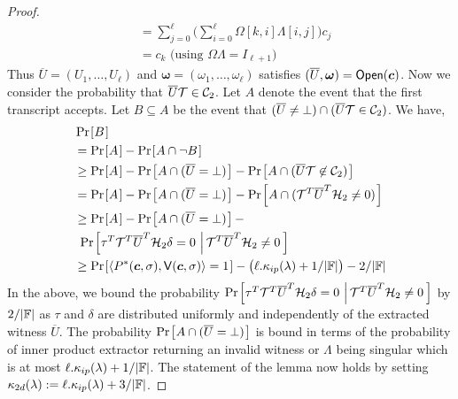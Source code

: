 \begin{proof}
\begin{align*}
	&= \sum_{j=0}^{\ell}\big(\sum_{i=0}^{\ell}\Omega[k,i]\Lambda[i,j]\big)c_j
\\
	&= c_k \text{ (using $\Omega\Lambda=I_{\ell+1})$ }
\end{align*}
Thus $\overline{U}=(U_1,\ldots,U_{\ell})$ and $\bm{\omega}=(\omega_1,\ldots,\omega_{\ell})$ satisfies $(\overline{U},\bm{\omega})=\mathsf{Open}(\bm{c})$. Now we
consider the probability that $\overline{U}\mathcal{T}\in \mathcal{C}_2$. Let $A$ denote the event
that the first transcript accepts. Let $B\subseteq A$ be the event that
$(\overline{U}\neq\bot)\cap (\overline{U}\mathcal{T}\in \mathcal{C}_2)$. We have,
\begin{align*}
&\prob{B}\\ &= \prob{A} - \prob{A\cap \neg B} \\
	&\geq \prob{A} - \prob{A\cap (\overline{U}=\bot)} - \prob{A\cap
(\overline{U}\mc{T}\not\in \mc{C}_2)} \\
	&= \prob{A} - \prob{A\cap (\overline{U}=\bot)} - \prob{A\cap
(\mc{T}^T\overline{U}^T\mc{H}_2\neq 0)} \\
	&\geq \prob{A} - \prob{A\cap (\overline{U}=\bot)} -\\
& \text{     }\condprob{\tau^T\mc{T}^T\overline{U}^T\mc{H}_2\delta=
0}{\mc{T}^T\overline{U}^T\mc{H}_2\neq 0} \\
	&\geq \prob{\langle P^\ast(\bm{c},\sigma),\verifier(\bm{c},\sigma)\rangle=1}
- \big(\ell.\kappa_{ip}(\secpar)+1/|\FF|\big) - 2/|\FF|
\end{align*} 
In the above, we bound the probability $\condprob{\tau^T\mc{T}^T\overline{U}^T\mc{H}_2\delta=
0}{\mc{T}^T\overline{U}^T\mc{H}_2\neq 0}$ by $2/|\mathbb{F}|$ as $\tau$ and $\delta$ are
distributed uniformly and independently of the extracted witness $\overline{U}$. The
probability $\prob{A\cap (\overline{U}=\bot)}$ is bound in terms of the probability
of inner product extractor returning an invalid witness or $\Lambda$ being
singular which is at most $\ell.\kappa_{ip}(\lambda)+1/|\mathbb{F}|$. The
statement of the lemma now holds by setting
$\kappa_{2d}(\lambda):=\ell.\kappa_{ip}(\lambda) + 3/|\mathbb{F}|$.
\end{proof}

